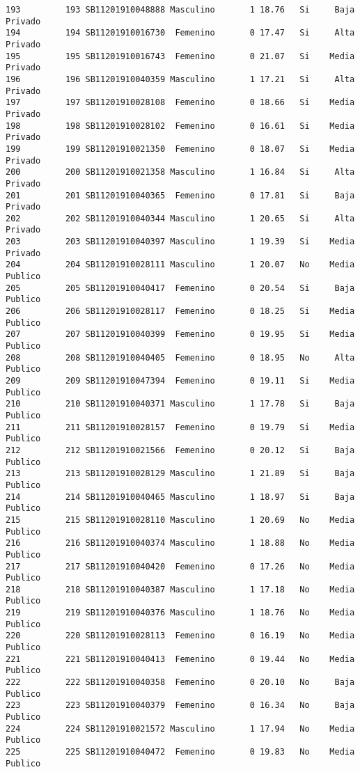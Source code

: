 \documentclass[
  letterpaper,
  DIV=11,
  numbers=noendperiod]{scrartcl}
\begin{document}
\begin{verbatim}
193         193 SB11201910048888 Masculino       1 18.76   Si     Baja Privado
194         194 SB11201910016730  Femenino       0 17.47   Si     Alta Privado
195         195 SB11201910016743  Femenino       0 21.07   Si    Media Privado
196         196 SB11201910040359 Masculino       1 17.21   Si     Alta Privado
197         197 SB11201910028108  Femenino       0 18.66   Si    Media Privado
198         198 SB11201910028102  Femenino       0 16.61   Si    Media Privado
199         199 SB11201910021350  Femenino       0 18.07   Si    Media Privado
200         200 SB11201910021358 Masculino       1 16.84   Si     Alta Privado
201         201 SB11201910040365  Femenino       0 17.81   Si     Baja Privado
202         202 SB11201910040344 Masculino       1 20.65   Si     Alta Privado
203         203 SB11201910040397 Masculino       1 19.39   Si    Media Privado
204         204 SB11201910028111 Masculino       1 20.07   No    Media Publico
205         205 SB11201910040417  Femenino       0 20.54   Si     Baja Publico
206         206 SB11201910028117  Femenino       0 18.25   Si    Media Publico
207         207 SB11201910040399  Femenino       0 19.95   Si    Media Publico
208         208 SB11201910040405  Femenino       0 18.95   No     Alta Publico
209         209 SB11201910047394  Femenino       0 19.11   Si    Media Publico
210         210 SB11201910040371 Masculino       1 17.78   Si     Baja Publico
211         211 SB11201910028157  Femenino       0 19.79   Si    Media Publico
212         212 SB11201910021566  Femenino       0 20.12   Si     Baja Publico
213         213 SB11201910028129 Masculino       1 21.89   Si     Baja Publico
214         214 SB11201910040465 Masculino       1 18.97   Si     Baja Publico
215         215 SB11201910028110 Masculino       1 20.69   No    Media Publico
216         216 SB11201910040374 Masculino       1 18.88   No    Media Publico
217         217 SB11201910040420  Femenino       0 17.26   No    Media Publico
218         218 SB11201910040387 Masculino       1 17.18   No    Media Publico
219         219 SB11201910040376 Masculino       1 18.76   No    Media Publico
220         220 SB11201910028113  Femenino       0 16.19   No    Media Publico
221         221 SB11201910040413  Femenino       0 19.44   No    Media Publico
222         222 SB11201910040358  Femenino       0 20.10   No     Baja Publico
223         223 SB11201910040379  Femenino       0 16.34   No     Baja Publico
224         224 SB11201910021572 Masculino       1 17.94   No    Media Publico
225         225 SB11201910040472  Femenino       0 19.83   No    Media Publico

\end{verbatim}
\end{document}
